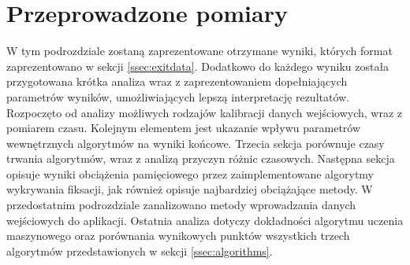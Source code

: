 \section{Przeprowadzone pomiary}
W tym podrozdziale zostaną zaprezentowane otrzymane wyniki, których format zaprezentowano w sekcji \ref{ssec:exitdata}. Dodatkowo do każdego wyniku została przygotowana krótka analiza wraz z zaprezentowaniem dopełniających parametrów wyników, umożliwiających lepszą interpretację rezultatów. Rozpoczęto od analizy możliwych rodzajów kalibracji danych wejściowych, wraz z pomiarem czasu. Kolejnym elementem jest ukazanie wpływu parametrów wewnętrznych algorytmów na wyniki końcowe. Trzecia sekcja porównuje czasy trwania algorytmów, wraz z analizą przyczyn różnic czasowych. Następna sekcja opisuje wyniki obciążenia pamięciowego przez zaimplementowane algorytmy wykrywania fiksacji, jak również opisuje najbardziej obciążające metody. W przedostatnim podrozdziale zanalizowano metody wprowadzania danych wejściowych do aplikacji. Ostatnia analiza dotyczy dokładności algorytmu uczenia maszynowego oraz porównania wynikowych punktów wszystkich trzech algorytmów przedstawionych w sekcji \ref{ssec:algorithms}.
